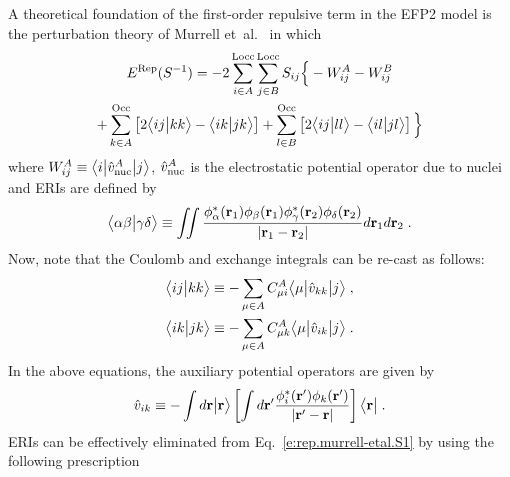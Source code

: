 A theoretical foundation of the
first\hyp{}order repulsive term in the EFP2 model
is the perturbation theory of
Murrell et~al.~\cite{Murrell.Randic.Williams.Longuet-Higgins.ProcRSocLondA.1965} 
in which
%
\begin{multline} \label{e:rep.murrell-etal.S1}
    E^{\rm Rep}(S^{-1}) = -2\sum_{i\in A}^{\rm Locc} \sum_{j\in B}^{\rm Locc}
               S_{ij} \Big\{
         - W^A_{ij} 
         - W^B_{ij} \\
 + \sum_{k\in A}^{\rm Occ} \left[ 2\BraKet{ij}{kk} - \BraKet{ik}{jk} \right] 
 + \sum_{l\in B}^{\rm Occ} \left[ 2\BraKet{ij}{ll} - \BraKet{il}{jl} \right]
                \Big\}
\end{multline}
%
where $W^A_{ij} \equiv \tBraKet{i}{\hat{v}^A_{\rm nuc}}{j}$,
$\hat{v}^A_{\rm nuc}$
is the electrostatic potential operator due to nuclei
and
ERIs are defined by
%
\begin{equation} \label{e:eri}
	\BraKet{\alpha\beta}{\gamma\delta} \equiv
	\iint 
	\frac{ \phi_\alpha^{*}({\bf r}_1) \phi_\beta({\bf r}_1) 
	       \phi_\gamma^{*}({\bf r}_2) \phi_\delta({\bf r}_2) }{ \vert {\bf r}_1 - {\bf r}_2 \vert}
	d{\bf r}_1 d{\bf r}_2  \;.
\end{equation}
%
Now, note that the Coulomb and exchange integrals can be re\hyp{}cast as follows:
%
\begin{subequations}
 \begin{align}
 \BraKet{ij}{kk} &\equiv - \sum_{\mu\in A} 
     C_{\mu i}^A \tBraKet{\mu}{\hat{v}_{kk}}{j} \;, \\
 \BraKet{ik}{jk} &\equiv - \sum_{\mu\in A} 
     C_{\mu k}^A \tBraKet{\mu}{\hat{v}_{ik}}{j} \;.
 \end{align}
\end{subequations}
%
%
%
In the above equations, the auxiliary potential operators are given by
%
\begin{equation}
  \hat{v}_{ik} \equiv - \int d{\bf r} \Ket{{\bf r}} 
        \left[
        \int d{\bf r}' \frac{\phi_i^{*}({\bf r}') \phi_k({\bf r}')}{\vert {\bf r}' - {\bf r}\vert}
        \right] \Bra{{\bf r}} \;.
\end{equation}
%
ERIs can be effectively eliminated from Eq.~\eqref{e:rep.murrell-etal.S1} 
by using the following prescription~\cite{Blasiak.Bednarska.Choluj.Bartkowiak.JCP.2019}
